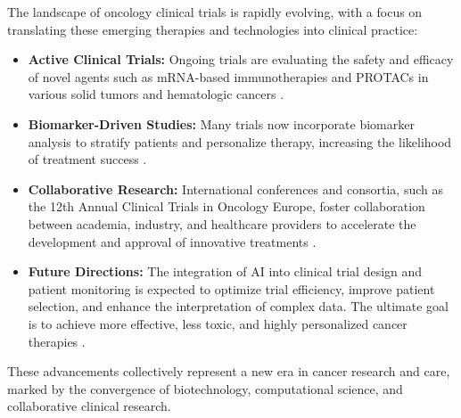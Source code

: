 The landscape of oncology clinical trials is rapidly evolving, with a focus on translating these 
emerging therapies and technologies into clinical practice:

\begin{itemize}
    \item \textbf{Active Clinical Trials:} Ongoing trials are evaluating the safety and efficacy of 
    novel agents such as mRNA-based immunotherapies and PROTACs in various solid tumors and 
    hematologic cancers \cite{aiEarlyDetection2025, aiOncology2025}.
    
    \item \textbf{Biomarker-Driven Studies:} Many trials now incorporate biomarker analysis to 
    stratify patients and personalize therapy, increasing the likelihood of treatment success 
    \cite{therapeuticCancerVaccines2025}.
    
    \item \textbf{Collaborative Research:} International conferences and consortia, such as the 12th 
    Annual Clinical Trials in Oncology Europe, foster collaboration between academia, industry, and 
    healthcare providers to accelerate the development and approval of innovative treatments 
    \cite{geneEditingTherapy2025}.
    
    \item \textbf{Future Directions:} The integration of AI into clinical trial design and patient 
    monitoring is expected to optimize trial efficiency, improve patient selection, and enhance the 
    interpretation of complex data. The ultimate goal is to achieve more effective, less toxic, and 
    highly personalized cancer therapies \cite{clinicalTrialsEurope2025, nlmCitingMedicine2007}.
\end{itemize}

\newpage

These advancements collectively represent a new era in cancer research and care, marked by the 
convergence of biotechnology, computational science, and collaborative clinical research.
